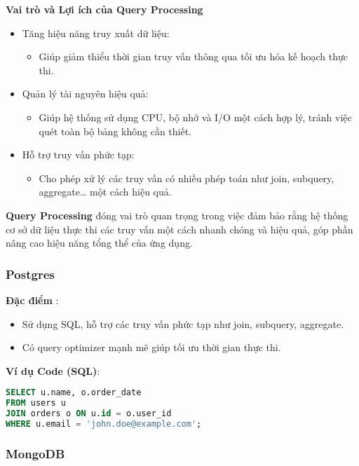 \noindent
\textbf{Vai trò và Lợi ích của Query Processing}

\begin{itemize}
    \item Tăng hiệu năng truy xuất dữ liệu:
    \begin{itemize}
        \item Giúp giảm thiểu thời gian truy vấn thông qua tối ưu hóa kế hoạch thực thi.
    \end{itemize}
    \item Quản lý tài nguyên hiệu quả:
    \begin{itemize}
        \item Giúp hệ thống sử dụng CPU, bộ nhớ và I/O một cách hợp lý, tránh việc quét toàn bộ bảng không cần thiết.
    \end{itemize}
    \item Hỗ trợ truy vấn phức tạp:
    \begin{itemize}
        \item Cho phép xử lý các truy vấn có nhiều phép toán như join, subquery, aggregate… một cách hiệu quả.
    \end{itemize}
\end{itemize}

\textbf{Query Processing} đóng vai trò quan trọng trong việc đảm bảo rằng hệ thống cơ sở dữ liệu thực thi các truy vấn một cách nhanh chóng và hiệu quả, góp phần nâng cao hiệu năng tổng thể của ứng dụng.

\subsubsection{Postgres}

\textbf{Đặc điểm} : 
\begin{itemize}
    \item Sử dụng SQL, hỗ trợ  các truy vấn phức tạp như join, subquery, aggregate.
    \item Có query optimizer mạnh mẽ giúp tối ưu thời gian thực thi.
\end{itemize}

\textbf{Ví dụ Code (SQL)}:

\begin{lstlisting}[language=sql]
SELECT u.name, o.order_date
FROM users u
JOIN orders o ON u.id = o.user_id
WHERE u.email = 'john.doe@example.com';
\end{lstlisting}


\subsubsection{MongoDB}

